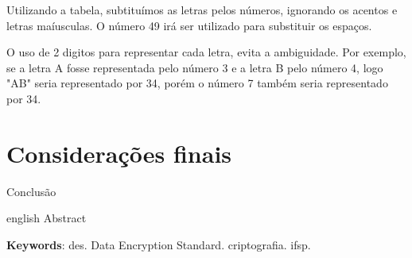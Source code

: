 \documentclass[
	article,			%
	12pt,				%
	oneside,			%
	a4paper,			%
	english,			%
	brazil,				%
	sumario=tradicional
	]{abntex2}
\begin{document}
Utilizando a tabela, subtituímos as letras pelos números, ignorando os acentos e letras maíusculas. O número 49 irá ser utilizado para substituir os espaços.

O uso de 2 digitos para representar cada letra, evita a ambiguidade. Por exemplo, se a letra A fosse representada pelo número 3 e a letra B pelo número 4, logo "AB" seria representado por 34, porém o número 7 também seria representado por 34.


\section*{Considerações finais}

Conclusão


\postextual


\emptythanks
\maketitle

\renewcommand{\resumoname}{Abstract}
\begin{resumoumacoluna}
 \begin{otherlanguage*}{english}
   Abstract

   \vspace{\onelineskip}
 
   \noindent
   \textbf{Keywords}: des. Data Encryption Standard. criptografia. ifsp.
 \end{otherlanguage*}  
\end{resumoumacoluna}


\end{document}
